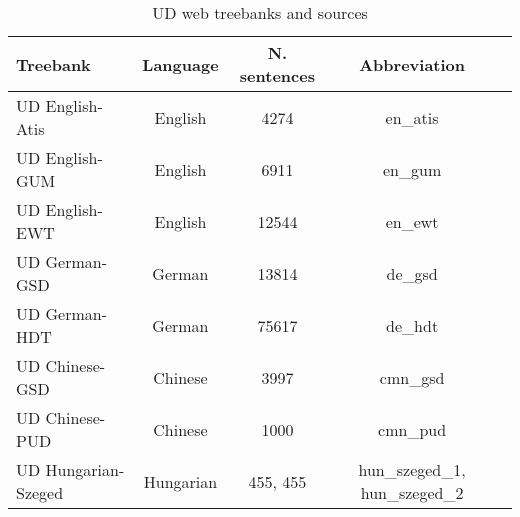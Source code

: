 \begin{table*}[ht]
    \centering
    \begin{tabular}{lcccc}
        \hline
        \textbf{Treebank} & \textbf{Language} & \textbf{N. sentences} & \textbf{Abbreviation}\\
        \hline
        UD English-Atis & English & 4274 & en\_atis \\
        \hline
        UD English-GUM & English & 6911 & en\_gum \\
        \hline
        UD English-EWT & English & 12544 & en\_ewt \\
        \hline
        UD German-GSD & German & 13814 & de\_gsd \\
        \hline
        UD German-HDT & German & 75617 & de\_hdt \\
        \hline
        UD Chinese-GSD & Chinese & 3997 & cmn\_gsd \\
        \hline
        UD Chinese-PUD & Chinese & 1000 & cmn\_pud \\
        \hline
        UD Hungarian-Szeged & Hungarian & 455, 455 & hun\_szeged\_1, hun\_szeged\_2 \\
        \hline
    \end{tabular}
    \caption{UD web treebanks and sources}
    \label{tab:webdata}
\end{table*}